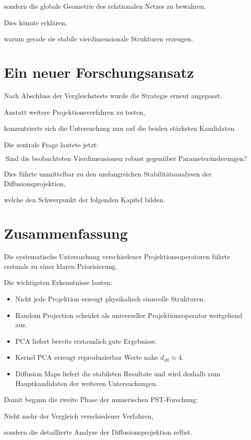 sondern die globale Geometrie des relationalen Netzes zu bewahren.

Dies könnte erklären,

warum gerade sie stabile vierdimensionale Strukturen erzeugen.


\section*{Ein neuer Forschungsansatz}

Nach Abschluss der Vergleichstests wurde die Strategie erneut angepasst.

Anstatt weitere Projektionsverfahren zu testen,

konzentrierte sich die Untersuchung nun auf die beiden stärksten Kandidaten.

Die zentrale Frage lautete jetzt:

\[
\boxed{
\text{Sind die beobachteten Vierdimensionen robust gegenüber Parameteränderungen?}
}
\]

Dies führte unmittelbar zu den umfangreichen Stabilitätsanalysen der Diffusionsprojektion,

welche den Schwerpunkt der folgenden Kapitel bilden.


\section*{Zusammenfassung}

Die systematische Untersuchung verschiedener Projektionsoperatoren führte erstmals zu einer klaren Priorisierung.

Die wichtigsten Erkenntnisse lauten:

\begin{itemize}

\item
Nicht jede Projektion erzeugt physikalisch sinnvolle Strukturen.

\item
Random Projection scheidet als universeller Projektionsoperator weitgehend aus.

\item
PCA liefert bereits erstaunlich gute Ergebnisse.

\item
Kernel PCA erzeugt reproduzierbar Werte nahe
\(
d_{\mathrm{eff}}\approx4.
\)

\item
Diffusion Maps liefert die stabilsten Resultate und wird deshalb zum Hauptkandidaten der weiteren Untersuchungen.

\end{itemize}

Damit begann die zweite Phase der numerischen PST-Forschung:

Nicht mehr der Vergleich verschiedener Verfahren,

sondern die detaillierte Analyse der Diffusionsprojektion selbst.

